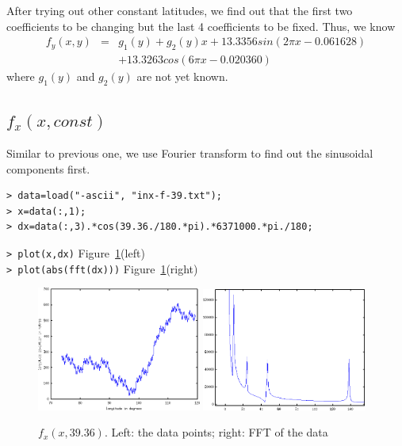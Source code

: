 \documentclass[a4paper]{article}
\begin{document}
After trying out other constant latitudes, we find out that the first two
coefficients to be changing but the last 4 coefficients to be fixed.
Thus, we know
\begin{eqnarray}
f_y(x,y) & = & g_1(y)+g_2(y)x+13.3356sin(2\pi x-0.061628) \nonumber \\
         &   & +13.3263cos(6\pi x-0.020360)
\end{eqnarray}
where $g_1(y)$ and $g_2(y)$ are not yet known.

\subsection{$f_x(x, const)$}
Similar to previous one, we use Fourier transform to find out the sinusoidal
components first.
\begin{verbatim}
> data=load("-ascii", "inx-f-39.txt");
> x=data(:,1);
> dx=data(:,3).*cos(39.36./180.*pi).*6371000.*pi./180;
\end{verbatim}
\verb|> plot(x,dx)| \hfill Figure~\ref{fig:fxx-fft}(left) \\
\verb|> plot(abs(fft(dx)))| \hfill Figure~\ref{fig:fxx-fft}(right) \\

\begin{figure}[htb]
\begin{center}
\includegraphics[width=0.48\textwidth]{fxx-data.png}
\includegraphics[width=0.48\textwidth]{fxx-fft.png}
\end{center}
\caption{$f_x(x,39.36)$. Left: the data points; right: FFT of the data}
\label{fig:fxx-fft}
\end{figure}
\end{document}
